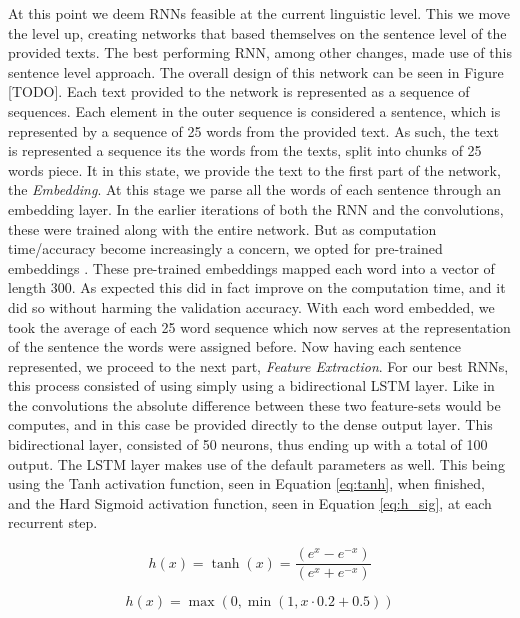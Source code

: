 At this point we deem \gls{RNN}s feasible at the current linguistic level.
This we move the level up, creating networks that based themselves on the
sentence level of the provided texts. The best performing \gls{RNN}, among
other changes, made use of this sentence level approach. The overall design of
this network can be seen in Figure [TODO]. Each text provided to the network is
represented as a sequence of sequences. Each element in the outer sequence is
considered a sentence, which is represented by a sequence of 25 words from the
provided text. As such, the text is represented a sequence its the words from
the texts, split into chunks of 25 words piece. It in this state, we provide the
text to the first part of the network, the \textit{Embedding}. At this stage we
parse all the words of each sentence through an embedding layer. In the earlier
iterations of both the \gls{RNN} and the convolutions, these were trained along
with the entire network. But as computation time/accuracy become increasingly
a concern, we opted for pre-trained embeddings \cite{bojanowski2016}. These
pre-trained embeddings mapped each word into a vector of length 300. As expected
this did in fact improve on the computation time, and it did so without harming
the validation accuracy. With each word embedded, we took the average of each 25
word sequence which now serves at the representation of the sentence the words
were assigned before. Now having each sentence represented, we proceed to the
next part, \textit{Feature Extraction}. For our best \gls{RNN}s, this process
consisted of using simply using a bidirectional \gls{LSTM} layer. Like in the
convolutions the absolute difference between these two feature-sets would be
computes, and in this case be provided directly to the dense output layer. This
bidirectional layer, consisted of 50 neurons, thus ending up with a total of
100 output. The \gls{LSTM} layer makes use of the default parameters as well.
This being using the Tanh activation function, seen in Equation \eqref{eq:tanh},
when finished, and the Hard Sigmoid activation function, seen in Equation
\eqref{eq:h_sig}, at each recurrent step.

\begin{equation}\label{eq:tanh}
h(x) = \tanh(x) = \frac{(e^x - e^{-x})}{(e^x + e^{-x})}
\end{equation}

\begin{equation}\label{eq:h_sig}
h(x) = \max(0, \min(1, x \cdot 0.2 + 0.5))
\end{equation}


